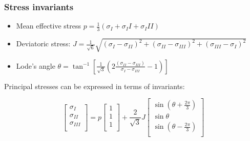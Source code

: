 \documentclass[notes]{beamer}
\begin{document}
\begin{frame}
\frametitle{Stress invariants}
\begin{itemize}
	\item Mean effective stress $p = \frac{1}{3}(\sigma_I + \sigma_II + \sigma_III)$
	\item Deviatoric stress: $J = \frac{1}{\sqrt{6}}\sqrt{(\sigma_I - \sigma_{II})^2 + (\sigma_{II} - \sigma_{III})^2 + (\sigma_{III} - \sigma_I)^2}$
	\item Lode's angle $\theta = \tan^{-1}\left[\frac{1}{\sqrt{3}}\left(2\frac{(\sigma_{II} - \sigma_{III})}{\sigma_I - \sigma_{III}} -1 \right)\right]$
\end{itemize}

Principal stresses can be expressed in terms of invariants:

\begin{equation*}
\begin{bmatrix}
\sigma_I \\
\sigma_{II} \\
\sigma_{III} \\
\end{bmatrix} = 
p \begin{bmatrix}
1 \\
1 \\
1 \\
\end{bmatrix} + 
\frac{2}{\sqrt{3}}J
\begin{bmatrix}
\sin\left(\theta + \frac{2 \pi}{3}\right) \\
\sin \theta \\
\sin\left(\theta - \frac{2 \pi}{3}\right) \\
\end{bmatrix}
\end{equation*}
\end{frame}
\end{document}

